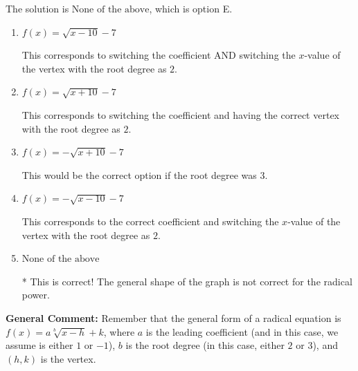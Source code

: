 \documentclass{extbook}[14pt]
\begin{document}
\begin{enumerate}
{The solution is \( \text{None of the above} \), which is option E.\begin{enumerate}[label=\Alph*.]
\item \( f(x) = \sqrt{x - 10} - 7 \)

This corresponds to switching the coefficient AND switching the $x$-value of the vertex with the root degree as $2$.
\item \( f(x) = \sqrt{x + 10} - 7 \)

This corresponds to switching the coefficient and having the correct vertex with the root degree as $2$.
\item \( f(x) = - \sqrt{x + 10} - 7 \)

This would be the correct option if the root degree was $3$.
\item \( f(x) = - \sqrt{x - 10} - 7 \)

This corresponds to the correct coefficient and switching the $x$-value of the vertex with the root degree as $2$.
\item \( \text{None of the above} \)

* This is correct! The general shape of the graph is not correct for the radical power.
\end{enumerate}

\textbf{General Comment:} Remember that the general form of a radical equation is $ f(x) = a \sqrt[b]{x - h} + k$, where $a$ is the leading coefficient (and in this case, we assume is either $1$ or $-1$), $b$ is the root degree (in this case, either $2$ or $3$), and $(h, k)$ is the vertex.
}
\end{enumerate}
\end{document}
